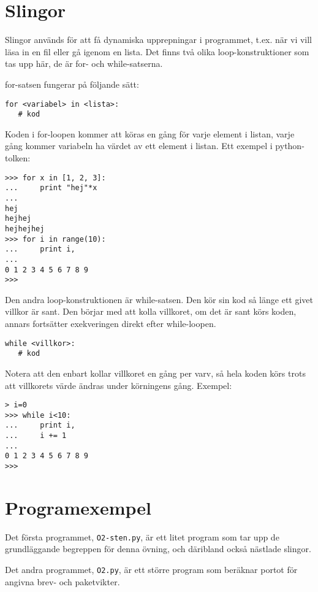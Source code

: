 \section{Slingor}

Slingor används för att få dynamiska upprepningar i programmet, t.ex. när vi
vill läsa in en fil eller gå igenom en lista. Det finns två olika
loop-konstruktioner som tas upp här, de är for- och while-satserna.

for-satsen fungerar på följande sätt:
\begin{lstlisting}
for <variabel> in <lista>:
   # kod
\end{lstlisting}
Koden i for-loopen kommer att köras en gång för varje element i listan, varje
gång kommer variabeln ha värdet av ett element i listan. Ett exempel i
python-tolken:
\begin{lstlisting}[style=text]
>>> for x in [1, 2, 3]:
...     print "hej"*x
...
hej
hejhej
hejhejhej
>>> for i in range(10):
...     print i,
...
0 1 2 3 4 5 6 7 8 9
>>>
\end{lstlisting}

Den andra loop-konstruktionen är while-satsen. Den kör sin kod så länge ett
givet villkor är sant. Den börjar med att kolla villkoret, om det är sant körs
koden, annars fortsätter exekveringen direkt efter while-loopen.
\begin{lstlisting}
while <villkor>:
   # kod
\end{lstlisting}
Notera att den enbart kollar villkoret en gång per varv, så hela koden körs
trots att villkorets värde ändras under körningens gång. Exempel:
\begin{lstlisting}[style=text]
> i=0
>>> while i<10:
...     print i,
...     i += 1
...
0 1 2 3 4 5 6 7 8 9
>>>
\end{lstlisting}



\section{Programexempel}

Det första programmet, \verb'O2-sten.py', är ett litet program som tar upp de
grundläggande begreppen för denna övning, och däribland också nästlade slingor.


Det andra programmet, \verb'O2.py', är ett större program som beräknar portot
för angivna brev- och paketvikter.

